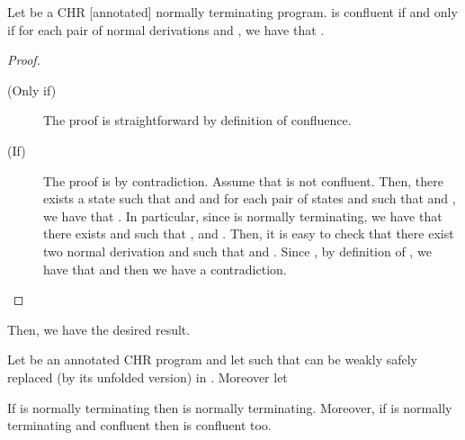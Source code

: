 \documentclass{tlp}
\begin{document}
\begin{lemma}\label{conflnormterm}
Let  be a CHR [annotated] normally terminating program.  is confluent if and only if for each pair of normal derivations  and , we have that
.
\end{lemma}
\begin{proof}
\begin{description}
  \item[(Only if)] The proof is straightforward by definition of confluence.
  \item[(If)] The proof is by contradiction. Assume that  is not confluent. Then, there exists a state  such that  and  and for each pair of states 
and  such that  and , we have that . In particular, since  is normally terminating, we have that there exists  and  such that
,  and .
Then, it is easy to check that there exist two normal derivation
 and  such that
 and . Since , by definition of , we have that  and then we have a contradiction.
\end{description}
\end{proof}


Then, we have the desired result.


\setcounter{proposition}{3}
\begin{proposition}
Let  be an annotated CHR program and let  such that 
can be weakly safely replaced (by its unfolded version) in . Moreover let

If  is normally terminating then  is normally terminating. Moreover, if  is normally terminating and confluent then  is confluent too.
\end{proposition}
\setcounter{proposition}{7}
\end{document}
